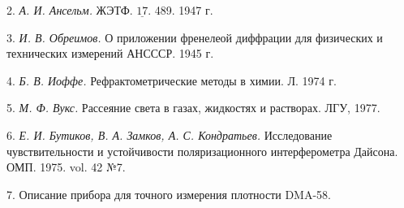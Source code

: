 2. {\itshape А. И. Ансельм.} ЖЭТФ. $\underline{17}$. 489. 1947 г.

3. {\itshape И. В. Обреимов.} О приложении френелеой диффрации для физических и технических измерений АНСССР. 1945 г.

4. {\itshape Б. В. Иоффе.} Рефрактометрические методы в химии. Л. 1974 г.

5. {\itshape М. Ф. Вукс.} Рассеяние света в газах, жидкостях и растворах. ЛГУ, 1977.

6. {\itshape Е. И. Бутиков, В. А. Замков, А. С. Кондратьев.} Исследование чувствительности и устойчивости
поляризационного интерферометра Дайсона. ОМП. 1975. vol. 42 №7.

7. Описание прибора для точного измерения плотности DMA-58.

